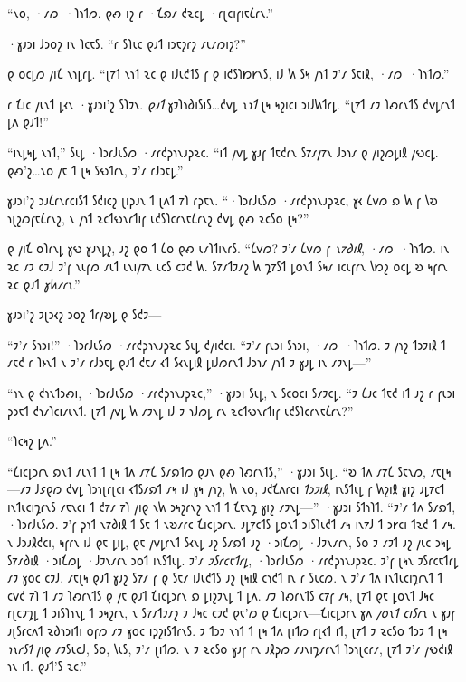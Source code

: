 “𐑯𐑴, ·𐑥𐑼~·𐑐𐑪𐑑𐑼. 𐑞𐑺 𐑦𐑟 𐑩 ·𐑗𐑸𐑥 𐑒𐑷𐑤𐑛 ·𐑩𐑚𐑤𐑦𐑝𐑦𐑱𐑖𐑩𐑯.”

·𐑣𐑨𐑮𐑦 𐑓𐑮𐑴𐑟 𐑦𐑯 𐑐𐑤𐑱𐑕. “𐑩 𐑕𐑐𐑧𐑤 𐑞𐑨𐑑 𐑦𐑮𐑱𐑟𐑩𐑟 𐑥𐑧𐑥𐑼𐑦𐑟?”

𐑞 𐑴𐑤𐑛𐑼 𐑢𐑦𐑗 𐑯𐑪𐑛𐑩𐑛. “𐑚𐑳𐑑 𐑯𐑪𐑑 𐑷𐑤 𐑞 𐑦𐑓𐑧𐑒𐑑𐑕 𐑝 𐑞 𐑦𐑒𐑕𐑐𐑽𐑾𐑯𐑕, 𐑦𐑓 𐑿 𐑕𐑰 𐑢𐑪𐑑 𐑲'𐑥 𐑕𐑱𐑦𐑙, ·𐑥𐑼~·𐑐𐑪𐑑𐑼.”

𐑩 𐑗𐑦𐑤 𐑢𐑧𐑯𐑑 𐑛𐑬𐑯 ·𐑣𐑨𐑮𐑦'𐑟 𐑕𐑐𐑲𐑯. \emph{𐑞𐑨𐑑} 𐑣𐑲𐑐𐑪𐑔𐑦𐑕𐑦𐑕…𐑒𐑫𐑛 \emph{𐑯𐑪𐑑} 𐑚𐑰 𐑰𐑟𐑦𐑤𐑦 𐑮𐑦𐑓𐑿𐑑𐑩𐑛. “𐑚𐑳𐑑 𐑥𐑲 𐑐𐑺𐑩𐑯𐑑𐑕 𐑒𐑫𐑛𐑩𐑯𐑑 𐑛𐑵 𐑞𐑨𐑑!”

“𐑦𐑯𐑛𐑰𐑛 𐑯𐑪𐑑,” 𐑕𐑧𐑛 ·𐑐𐑮𐑩𐑓𐑧𐑕𐑼 ·𐑥𐑩𐑒𐑜𐑪𐑯𐑨𐑜𐑷𐑤. “𐑦𐑑 𐑢𐑫𐑛 𐑣𐑨𐑝 𐑑𐑱𐑒𐑩𐑯 𐑕𐑳𐑥𐑢𐑳𐑯 𐑓𐑮𐑪𐑥 𐑞 𐑢𐑦𐑟𐑼𐑛𐑦𐑙 𐑢𐑻𐑤𐑛. 𐑞𐑺'𐑟…𐑯𐑴 𐑢𐑱 𐑑 𐑚𐑰 𐑕𐑻𐑑𐑩𐑯, 𐑲'𐑥 𐑩𐑓𐑮𐑱𐑛.”

𐑣𐑨𐑮𐑦'𐑟 𐑮𐑨𐑖𐑩𐑯𐑩𐑤𐑦𐑕𐑑 𐑕𐑒𐑦𐑤𐑟 𐑚𐑦𐑜𐑨𐑯 𐑑 𐑚𐑵𐑑 𐑳𐑐 𐑩𐑜𐑱𐑯. “·𐑐𐑮𐑩𐑓𐑧𐑕𐑼 ·𐑥𐑩𐑒𐑜𐑪𐑯𐑨𐑜𐑷𐑤, 𐑣𐑬 𐑖𐑫𐑼 𐑸 𐑿 𐑝 𐑘𐑹 𐑪𐑚𐑟𐑼𐑝𐑱𐑖𐑩𐑯𐑟, 𐑯 𐑢𐑪𐑑 𐑷𐑤𐑑𐑻𐑯𐑩𐑑𐑦𐑝 𐑧𐑒𐑕𐑐𐑤𐑩𐑯𐑱𐑖𐑩𐑯𐑟 𐑒𐑫𐑛 𐑞𐑺 𐑷𐑤𐑕𐑴 𐑚𐑰?”

𐑞 𐑢𐑦𐑗 𐑴𐑐𐑩𐑯𐑛 𐑣𐑻 𐑣𐑨𐑯𐑛𐑟, 𐑨𐑟 𐑞𐑴 𐑑 𐑖𐑴 𐑞𐑺 𐑧𐑥𐑐𐑑𐑦𐑯𐑩𐑕. “𐑖𐑫𐑼? 𐑲'𐑥 𐑖𐑫𐑼 𐑝 \emph{𐑯𐑳𐑔𐑦𐑙}, ·𐑥𐑼~·𐑐𐑪𐑑𐑼. 𐑦𐑯 𐑷𐑤 𐑥𐑲 𐑤𐑲𐑓 𐑲'𐑝 𐑯𐑧𐑝𐑼 𐑥𐑧𐑑 𐑧𐑯𐑦𐑢𐑳𐑯 𐑧𐑤𐑕 𐑤𐑲𐑒 𐑿. 𐑕𐑳𐑥𐑑𐑲𐑥𐑟 𐑿 𐑡𐑳𐑕𐑑 𐑛𐑴𐑯𐑑 𐑕𐑰𐑥 𐑦𐑤𐑧𐑝𐑩𐑯 𐑘𐑽𐑟 𐑴𐑤𐑛 𐑹 𐑰𐑝𐑩𐑯 𐑷𐑤 𐑞𐑨𐑑 \emph{𐑣𐑿𐑥𐑩𐑯}.”

𐑣𐑨𐑮𐑦'𐑟 𐑲𐑚𐑮𐑬𐑟 𐑮𐑴𐑟 𐑑𐑩𐑢𐑹𐑛 𐑞 𐑕𐑒𐑲—

“𐑲'𐑥 𐑕𐑪𐑮𐑦!” ·𐑐𐑮𐑩𐑓𐑧𐑕𐑼 ·𐑥𐑩𐑒𐑜𐑪𐑯𐑨𐑜𐑷𐑤 𐑕𐑧𐑛 𐑒𐑢𐑦𐑒𐑤𐑦. “𐑲'𐑥 𐑝𐑧𐑮𐑦 𐑕𐑪𐑮𐑦, ·𐑥𐑼~·𐑐𐑪𐑑𐑼. 𐑲 𐑢𐑪𐑟 𐑑𐑮𐑲𐑦𐑙 𐑑 𐑥𐑱𐑒 𐑩 𐑐𐑶𐑯𐑑 𐑯 𐑲'𐑥 𐑩𐑓𐑮𐑱𐑛 𐑞𐑨𐑑 𐑒𐑱𐑥 𐑬𐑑 𐑕𐑬𐑯𐑛𐑦𐑙 𐑛𐑦𐑓𐑼𐑩𐑯𐑑 𐑓𐑮𐑪𐑥 𐑢𐑪𐑑 𐑲 𐑣𐑨𐑛 𐑦𐑯 𐑥𐑲𐑯𐑛—”

“𐑪𐑯 𐑞 𐑒𐑪𐑯𐑑𐑮𐑺𐑦, ·𐑐𐑮𐑩𐑓𐑧𐑕𐑼 ·𐑥𐑩𐑒𐑜𐑪𐑯𐑨𐑜𐑷𐑤,” ·𐑣𐑨𐑮𐑦 𐑕𐑧𐑛, 𐑯 𐑕𐑤𐑴𐑤𐑦 𐑕𐑥𐑲𐑤𐑛. “𐑲 𐑖𐑨𐑤 𐑑𐑱𐑒 𐑦𐑑 𐑨𐑟 𐑩 𐑝𐑧𐑮𐑦 𐑜𐑮𐑱𐑑 𐑒𐑪𐑥𐑐𐑤𐑦𐑥𐑧𐑯𐑑. 𐑚𐑳𐑑 𐑢𐑫𐑛 𐑿 𐑥𐑲𐑯𐑛 𐑦𐑓 𐑲 𐑪𐑓𐑼𐑛 𐑩𐑯 𐑷𐑤𐑑𐑻𐑯𐑩𐑑𐑦𐑝 𐑧𐑒𐑕𐑐𐑤𐑩𐑯𐑱𐑖𐑩𐑯?”

“𐑐𐑤𐑰𐑟 𐑛𐑵.”

“𐑗𐑦𐑤𐑛𐑮𐑩𐑯 𐑸𐑯𐑑 𐑥𐑧𐑯𐑑 𐑑 𐑚𐑰 𐑑𐑵 𐑥𐑳𐑗 𐑕𐑥𐑸𐑑𐑼 𐑞𐑨𐑯 𐑞𐑺 𐑐𐑺𐑩𐑯𐑑𐑕,” ·𐑣𐑨𐑮𐑦 𐑕𐑧𐑛. “𐑹 𐑑𐑵 𐑥𐑳𐑗 𐑕𐑱𐑯𐑼, 𐑥𐑱𐑚𐑰—𐑥𐑲 𐑓𐑭𐑞𐑼 𐑒𐑫𐑛 𐑐𐑮𐑪𐑚𐑩𐑚𐑤𐑦 𐑬𐑑𐑕𐑥𐑸𐑑 𐑥𐑰 𐑦𐑓 𐑣𐑰 𐑢𐑪𐑟, 𐑿 𐑯𐑴, 𐑨𐑒𐑗𐑵𐑩𐑤𐑦 \emph{𐑑𐑮𐑲𐑦𐑙}, 𐑦𐑯𐑕𐑑𐑧𐑛 𐑝 𐑿𐑟𐑦𐑙 𐑣𐑦𐑟 𐑨𐑛𐑳𐑤𐑑 𐑦𐑯𐑑𐑧𐑤𐑦𐑡𐑩𐑯𐑕 𐑥𐑱𐑯𐑤𐑦 𐑑 𐑒𐑳𐑥 𐑳𐑐 𐑢𐑦𐑞 𐑯𐑿 𐑮𐑰𐑟𐑩𐑯𐑟 𐑯𐑪𐑑 𐑑 𐑗𐑱𐑯𐑡 𐑣𐑦𐑟 𐑥𐑲𐑯𐑛—” ·𐑣𐑨𐑮𐑦 𐑕𐑑𐑪𐑐𐑑. “𐑲'𐑥 𐑑𐑵 𐑕𐑥𐑸𐑑, ·𐑐𐑮𐑩𐑓𐑧𐑕𐑼. 𐑲'𐑝 𐑜𐑪𐑑 𐑯𐑳𐑔𐑦𐑙 𐑑 𐑕𐑱 𐑑 𐑯𐑹𐑥𐑩𐑤 𐑗𐑦𐑤𐑛𐑮𐑩𐑯. 𐑨𐑛𐑳𐑤𐑑𐑕 𐑛𐑴𐑯𐑑 𐑮𐑦𐑕𐑐𐑧𐑒𐑑 𐑥𐑰 𐑦𐑯𐑳𐑓 𐑑 𐑮𐑾𐑤𐑦 𐑑𐑷𐑒 𐑑 𐑥𐑰. 𐑯 𐑓𐑮𐑨𐑙𐑒𐑤𐑦, 𐑰𐑝𐑩𐑯 𐑦𐑓 𐑞𐑱 𐑛𐑦𐑛, 𐑞𐑱 𐑢𐑫𐑛𐑩𐑯𐑑 𐑕𐑬𐑯𐑛 𐑨𐑟 𐑕𐑥𐑸𐑑 𐑨𐑟 ·𐑮𐑦𐑗𐑼𐑛 ·𐑓𐑲𐑯𐑥𐑩𐑯, 𐑕𐑴 𐑲 𐑥𐑲𐑑 𐑨𐑟 𐑢𐑧𐑤 𐑮𐑰𐑛 𐑕𐑳𐑥𐑔𐑦𐑙 ·𐑮𐑦𐑗𐑼𐑛 ·𐑓𐑲𐑯𐑥𐑩𐑯 𐑮𐑴𐑑 𐑦𐑯𐑕𐑑𐑧𐑛. 𐑲'𐑥 \emph{𐑲𐑕𐑩𐑤𐑱𐑑𐑩𐑛}, ·𐑐𐑮𐑩𐑓𐑧𐑕𐑼 ·𐑥𐑩𐑒𐑜𐑪𐑯𐑨𐑜𐑷𐑤. 𐑲'𐑝 𐑚𐑰𐑯 𐑲𐑕𐑩𐑤𐑱𐑑𐑩𐑛 𐑥𐑲 𐑣𐑴𐑤 𐑤𐑲𐑓. 𐑥𐑱𐑚𐑰 𐑞𐑨𐑑 𐑣𐑨𐑟 𐑕𐑳𐑥 𐑝 𐑞 𐑕𐑱𐑥 𐑦𐑓𐑧𐑒𐑑𐑕 𐑨𐑟 𐑚𐑰𐑦𐑙 𐑤𐑪𐑒𐑑 𐑦𐑯 𐑩 𐑕𐑧𐑤𐑼. 𐑯 𐑲'𐑥 𐑑𐑵 𐑦𐑯𐑑𐑧𐑤𐑦𐑡𐑩𐑯𐑑 𐑑 𐑤𐑫𐑒 𐑳𐑐 𐑑 𐑥𐑲 𐑐𐑺𐑩𐑯𐑑𐑕 𐑞 𐑢𐑱 𐑞𐑨𐑑 𐑗𐑦𐑤𐑛𐑮𐑩𐑯 𐑸 𐑛𐑦𐑟𐑲𐑯𐑛 𐑑 𐑛𐑵. 𐑥𐑲 𐑐𐑺𐑩𐑯𐑑𐑕 𐑤𐑳𐑝 𐑥𐑰, 𐑚𐑳𐑑 𐑞𐑱 𐑛𐑴𐑯𐑑 𐑓𐑰𐑤 𐑩𐑚𐑤𐑲𐑡𐑛 𐑑 𐑮𐑦𐑕𐑐𐑪𐑯𐑛 𐑑 𐑮𐑰𐑟𐑩𐑯, 𐑯 𐑕𐑳𐑥𐑑𐑲𐑥𐑟 𐑲 𐑓𐑰𐑤 𐑤𐑲𐑒 𐑞𐑱'𐑼 𐑞 𐑗𐑦𐑤𐑛𐑮𐑩𐑯—𐑗𐑦𐑤𐑛𐑮𐑩𐑯 𐑣𐑵 \emph{𐑢𐑴𐑯𐑑 𐑤𐑦𐑕𐑩𐑯} 𐑯 𐑣𐑨𐑝 𐑨𐑚𐑕𐑩𐑤𐑵𐑑 𐑷𐑔𐑪𐑮𐑦𐑑𐑦 𐑴𐑝𐑼 𐑥𐑲 𐑣𐑴𐑤 𐑦𐑜𐑟𐑦𐑕𐑑𐑩𐑯𐑕. 𐑲 𐑑𐑮𐑲 𐑯𐑪𐑑 𐑑 𐑚𐑰 𐑑𐑵 𐑚𐑦𐑑𐑼 𐑩𐑚𐑬𐑑 𐑦𐑑, 𐑚𐑳𐑑 𐑲 𐑷𐑤𐑕𐑴 𐑑𐑮𐑲 𐑑 𐑚𐑰 \emph{𐑪𐑯𐑩𐑕𐑑} 𐑢𐑦𐑞 𐑥𐑲𐑕𐑧𐑤𐑓, 𐑕𐑴, 𐑘𐑧𐑕, 𐑲'𐑥 𐑚𐑦𐑑𐑼. 𐑯 𐑲 𐑷𐑤𐑕𐑴 𐑣𐑨𐑝 𐑩𐑯 𐑨𐑙𐑜𐑼 𐑥𐑨𐑯𐑦𐑡𐑥𐑩𐑯𐑑 𐑐𐑮𐑪𐑚𐑤𐑩𐑥, 𐑚𐑳𐑑 𐑲'𐑥 𐑢𐑻𐑒𐑦𐑙 𐑪𐑯 𐑦𐑑. 𐑞𐑨𐑑'𐑕 𐑷𐑤.”

